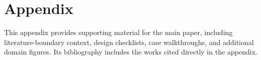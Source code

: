 \documentclass[manuscript]{acmart}
\begin{document}
\appendix
\section*{Appendix}

This appendix provides supporting material for the main paper, including literature-boundary context, design checklists, case walkthroughs, and additional domain figures. Its bibliography includes the works cited directly in the appendix.








\end{document}
